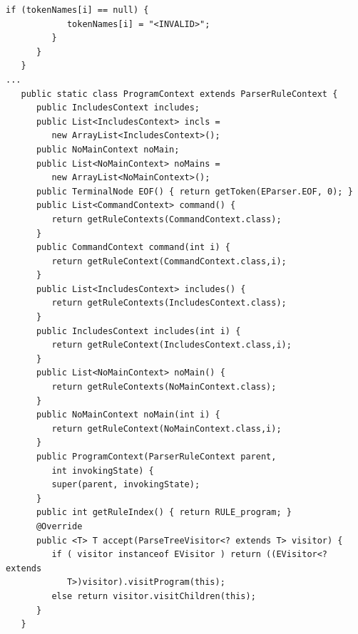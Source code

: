 \begin{lstlisting}[frame=htrbl, caption={Generation of {\ttfamily EParser.java}}, label={lst:parser}, basicstyle=\footnotesize]
         if (tokenNames[i] == null) {
            tokenNames[i] = "<INVALID>";
         }
      }
   }   
...
   public static class ProgramContext extends ParserRuleContext {
      public IncludesContext includes;
      public List<IncludesContext> incls = 
         new ArrayList<IncludesContext>();
      public NoMainContext noMain;
      public List<NoMainContext> noMains = 
         new ArrayList<NoMainContext>();
      public TerminalNode EOF() { return getToken(EParser.EOF, 0); }
      public List<CommandContext> command() {
         return getRuleContexts(CommandContext.class);
      }
      public CommandContext command(int i) {
         return getRuleContext(CommandContext.class,i);
      }
      public List<IncludesContext> includes() {
         return getRuleContexts(IncludesContext.class);
      }
      public IncludesContext includes(int i) {
         return getRuleContext(IncludesContext.class,i);
      }
      public List<NoMainContext> noMain() {
         return getRuleContexts(NoMainContext.class);
      }
      public NoMainContext noMain(int i) {
         return getRuleContext(NoMainContext.class,i);
      }
      public ProgramContext(ParserRuleContext parent, 
         int invokingState) {
         super(parent, invokingState);
      }
      public int getRuleIndex() { return RULE_program; }
      @Override
      public <T> T accept(ParseTreeVisitor<? extends T> visitor) {
         if ( visitor instanceof EVisitor ) return ((EVisitor<? extends
            T>)visitor).visitProgram(this);
         else return visitor.visitChildren(this);
      }
   }
   

\end{lstlisting}
